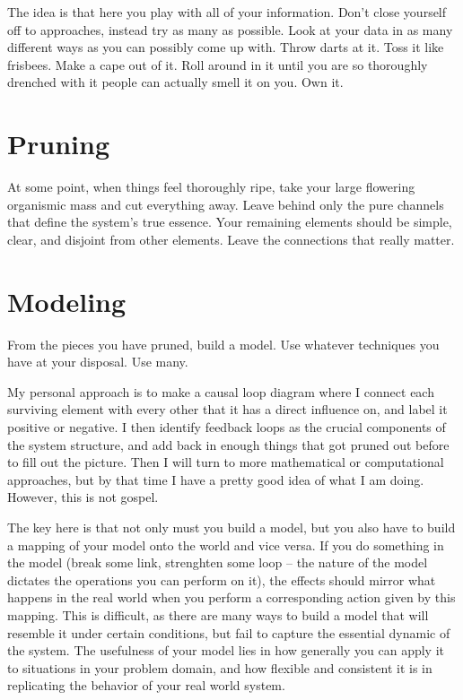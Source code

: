 \documentclass[11pt]{article}
\begin{document}
The idea is that here you play with all of your information.  Don't close yourself off to approaches, instead try as many as possible.  Look at your data in as many different ways as you can possibly come up with.  Throw darts at it.  Toss it like frisbees.  Make a cape out of it.  Roll around in it until you are so thoroughly drenched with it people can actually smell it on you.  Own it.

\section{Pruning}

At some point, when things feel thoroughly ripe, take your large flowering organismic mass and cut everything away.  Leave behind only the pure channels that define the system's true essence.  Your remaining elements should be simple, clear, and disjoint from other elements.  Leave the connections that really matter.

\section{Modeling}

From the pieces you have pruned, build a model.  Use whatever techniques you have at your disposal.  Use many.

My personal approach is to make a causal loop diagram where I connect each surviving element with every other that it has a direct influence on, and label it positive or negative.  I then identify feedback loops as the crucial components of the system structure, and add back in enough things that got pruned out before to fill out the picture.  Then I will turn to more mathematical or computational approaches, but by that time I have a pretty good idea of what I am doing.  However, this is not gospel.  

The key here is that not only must you build a model, but you also have to build a mapping of your model onto the world and vice versa.  If you do something in the model (break some link, strenghten some loop -- the nature of the model dictates the operations you can perform on it), the effects should mirror what happens in the real world when you perform a corresponding action given by this mapping.  This is difficult, as there are many ways to build a model that will resemble it under certain conditions, but fail to capture the essential dynamic of the system.  The usefulness of your model lies in how generally you can apply it to situations in your problem domain, and how flexible and consistent it is in replicating the behavior of your real world system.   
\end{document}
